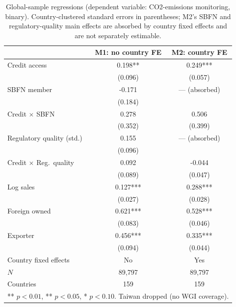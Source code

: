 \documentclass[review,authoryear,12pt]{elsarticle}
\begin{document}
\begin{table}[htbp]
\centering
\caption{Global-sample regressions (dependent variable: CO2-emissions monitoring, binary). Country-clustered standard errors in parentheses; M2's SBFN and regulatory-quality main effects are absorbed by country fixed effects and are not separately estimable.}
\label{tab:global}
\begin{tabular}{lcc}
\toprule
 & M1: no country FE & M2: country FE \\
\midrule
Credit access & 0.198** & 0.249*** \\
 & (0.096) & (0.057) \\
SBFN member & -0.171 & --- (absorbed) \\
 & (0.184) & \\
Credit $\times$ SBFN & 0.278 & 0.506 \\
 & (0.352) & (0.399) \\
Regulatory quality (std.) & 0.155 & --- (absorbed) \\
 & (0.096) & \\
Credit $\times$ Reg.\ quality & 0.092 & -0.044 \\
 & (0.089) & (0.047) \\
Log sales & 0.127*** & 0.288*** \\
 & (0.027) & (0.028) \\
Foreign owned & 0.621*** & 0.528*** \\
 & (0.083) & (0.046) \\
Exporter & 0.456*** & 0.335*** \\
 & (0.094) & (0.044) \\
Country fixed effects & No & Yes \\
\midrule
$N$ & 89{,}797 & 89{,}797 \\
Countries & 159 & 159 \\
\bottomrule
\multicolumn{3}{l}{\footnotesize *** $p<0.01$, ** $p<0.05$, * $p<0.10$. Taiwan dropped (no WGI coverage).}
\end{tabular}
\end{table}
\end{document}
